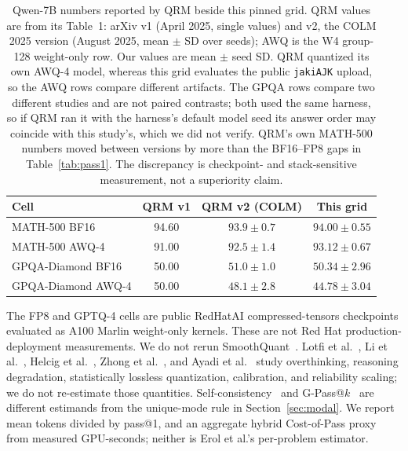 \documentclass[11pt,a4paper]{article}
\begin{document}
\begin{table}[t]
\centering
\caption{Qwen-7B numbers reported by QRM beside this pinned grid. QRM values are from its Table~1: arXiv v1 (April 2025, single values) and v2, the COLM 2025 version (August 2025, mean $\pm$ SD over seeds); AWQ is the W4 group-128 weight-only row. Our values are mean $\pm$ seed SD. QRM quantized its own AWQ-4 model, whereas this grid evaluates the public \texttt{jakiAJK} upload, so the AWQ rows compare different artifacts. The GPQA rows compare two different studies and are not paired contrasts; both used the same harness, so if QRM ran it with the harness's default model seed its answer order may coincide with this study's, which we did not verify. QRM's own MATH-500 numbers moved between versions by more than the BF16--FP8 gaps in Table~\ref{tab:pass1}. The discrepancy is checkpoint- and stack-sensitive measurement, not a superiority claim.}
\label{tab:qrm-compare}
\small
\begin{tabular}{lccc}
\toprule
\textbf{Cell} & \textbf{QRM v1} & \textbf{QRM v2 (COLM)} & \textbf{This grid} \\
\midrule
MATH-500 BF16 & 94.60 & $93.9\pm 0.7$ & $94.00\pm 0.55$ \\
MATH-500 AWQ-4 & 91.00 & $92.5\pm 1.4$ & $93.12\pm 0.67$ \\
GPQA-Diamond BF16 & 50.00 & $51.0\pm 1.0$ & $50.34\pm 2.96$ \\
GPQA-Diamond AWQ-4 & 50.00 & $48.1\pm 2.8$ & $44.78\pm 3.04$ \\
\bottomrule
\end{tabular}
\end{table}

The FP8 and GPTQ-4 cells are public RedHatAI compressed-tensors checkpoints evaluated as A100 Marlin weight-only kernels. These are not Red Hat production-deployment measurements. We do not rerun SmoothQuant~\cite{xiao2023smoothquant}. Lotfi et al.~\cite{lotfi2026overthinking}, Li et al.~\cite{li2025quantmeets}, Helcig et al.~\cite{helcig2026slq}, Zhong et al.~\cite{zhong2025quantized}, and Ayadi et al.~\cite{ayadi2026reliability} study overthinking, reasoning degradation, statistically lossless quantization, calibration, and reliability scaling; we do not re-estimate those quantities. Self-consistency~\cite{wang2022selfconsistency} and G-Pass@$k$~\cite{liu2025gpass} are different estimands from the unique-mode rule in Section~\ref{sec:modal}. We report mean tokens divided by pass@1, and an aggregate hybrid Cost-of-Pass proxy from measured GPU-seconds; neither is Erol et al.'s per-problem estimator.
\end{document}
